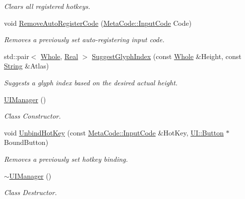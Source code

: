 \begin{DoxyCompactItemize}
\begin{DoxyCompactList}\small\item\em Clears all registered hotkeys. \item\end{DoxyCompactList}\item 
void \hyperlink{classphys_1_1UIManager_a0335a3ee8134edf514222896790a71d1}{RemoveAutoRegisterCode} (\hyperlink{classphys_1_1MetaCode_a3e501cbb5bf0f6f1fdb7211465bda8d8}{MetaCode::InputCode} Code)
\begin{DoxyCompactList}\small\item\em Removes a previously set auto-\/registering input code. \item\end{DoxyCompactList}\item 
std::pair$<$ \hyperlink{namespacephys_a460f6bc24c8dd347b05e0366ae34f34a}{Whole}, \hyperlink{namespacephys_af7eb897198d265b8e868f45240230d5f}{Real} $>$ \hyperlink{classphys_1_1UIManager_a9fff50f9a977e603e7c62a950b796a74}{SuggestGlyphIndex} (const \hyperlink{namespacephys_a460f6bc24c8dd347b05e0366ae34f34a}{Whole} \&Height, const \hyperlink{namespacephys_aa03900411993de7fbfec4789bc1d392e}{String} \&Atlas)
\begin{DoxyCompactList}\small\item\em Suggests a glyph index based on the desired actual height. \item\end{DoxyCompactList}\item 
\hyperlink{classphys_1_1UIManager_aeb502f11f170efd806b4153923c55359}{UIManager} ()
\begin{DoxyCompactList}\small\item\em Class Constructor. \item\end{DoxyCompactList}\item 
void \hyperlink{classphys_1_1UIManager_a9d79615c0c9f9895dd10ac0399aa6e81}{UnbindHotKey} (const \hyperlink{classphys_1_1MetaCode_a3e501cbb5bf0f6f1fdb7211465bda8d8}{MetaCode::InputCode} \&HotKey, \hyperlink{classphys_1_1UI_1_1Button}{UI::Button} $\ast$BoundButton)
\begin{DoxyCompactList}\small\item\em Removes a previously set hotkey binding. \item\end{DoxyCompactList}\item 
\hyperlink{classphys_1_1UIManager_a203144f08dbaf8068746359c22aa4f1e}{$\sim$UIManager} ()
\begin{DoxyCompactList}\small\item\em Class Destructor. \item\end{DoxyCompactList}\end{DoxyCompactItemize}
